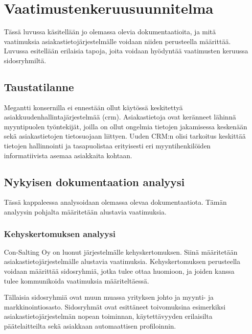 \chapter{Vaatimustenkeruusuunnitelma} %
\label{keruu} %
\thispagestyle{fancy} %

Tässä luvussa käsitellään jo olemassa olevia dokumentaatioita, ja mitä vaatimuksia asiakastietojärjestelmälle voidaan niiden perusteella määrittää. Luvussa esitellään erilaisia tapoja, joita voidaan hyödyntää vaatimusten keruussa sidosryhmiltä.

\section{Taustatilanne}

Megantti konsernilla ei ennestään ollut käytössä keskitettyä asiakkuudenhallintajärjestelmää (\acrshort{crm}).
Asiakastietoja ovat keränneet lähinnä myyntipuolen työntekijät, joilla on ollut ongelmia tietojen jakamisessa keskenään sekä asiakastietojen tietosuojaan liittyen. Uuden CRM:n olisi tarkoitus keskittää tietojen hallinnointi ja tasapuolistaa erityisesti eri myyntihenkilöiden informatiivista asemaa asiakkaita kohtaan.

\section{Nykyisen dokumentaation analyysi}
Tässä kappaleessa analysoidaan olemassa olevaa dokumentaatiota. Tämän analyysin pohjalta määritetään alustavia vaatimuksia.


    \subsection{Kehyskertomuksen analyysi}
    Con-Salting Oy on luonut järjestelmälle kehyskertomuksen. Siinä määritetään asiakastietojärjestelmälle alustavia vaatimuksia. Kehyskertomuksen perusteella voidaan määrittää sidosryhmiä, jotka tulee ottaa huomioon, ja joiden kanssa tulee kommunikoida vaatimuksia määriteltäessä.

    Tällaisia sidosryhmiä ovat muun muassa yrityksen johto ja myynti- ja markkinointiosasto.
    Sidosryhmät ovat esittäneet toivomuksina esimerkiksi asiakastietojärjestelmän nopean toiminnan, käytettävyyden erilaisilta päätelaitteilta sekä asiakkaan 
    automaattisen profiloinnin. 
        
